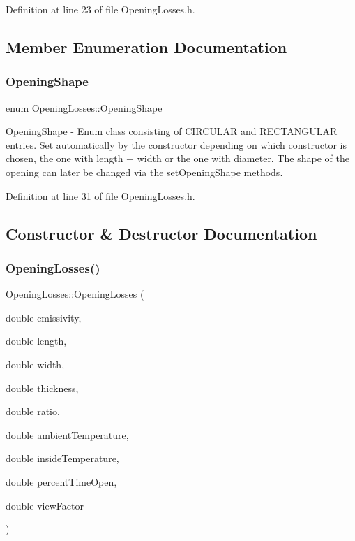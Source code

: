 Definition at line 23 of file Opening\+Losses.\+h.



\subsection{Member Enumeration Documentation}
\mbox{\label{class_opening_losses_a57f9759b6fd72a1b75aa885800e26157}} 
\subsubsection{\texorpdfstring{Opening\+Shape}{OpeningShape}}
{\footnotesize\ttfamily enum \hyperlink{class_opening_losses_a57f9759b6fd72a1b75aa885800e26157}{Opening\+Losses\+::\+Opening\+Shape}\hspace{0.3cm}{\ttfamily [strong]}}

Opening\+Shape -\/ Enum class consisting of C\+I\+R\+C\+U\+L\+AR and R\+E\+C\+T\+A\+N\+G\+U\+L\+AR entries. Set automatically by the constructor depending on which constructor is chosen, the one with length + width or the one with diameter. The shape of the opening can later be changed via the set\+Opening\+Shape methods. 

Definition at line 31 of file Opening\+Losses.\+h.



\subsection{Constructor \& Destructor Documentation}
\mbox{\label{class_opening_losses_a74205733c9a9b328bd9bf15c73841a8f}} 
\subsubsection{\texorpdfstring{Opening\+Losses()}{OpeningLosses()}\hspace{0.1cm}{\footnotesize\ttfamily [1/2]}}
{\footnotesize\ttfamily Opening\+Losses\+::\+Opening\+Losses (\begin{DoxyParamCaption}\item[{double}]{emissivity,  }\item[{double}]{length,  }\item[{double}]{width,  }\item[{double}]{thickness,  }\item[{double}]{ratio,  }\item[{double}]{ambient\+Temperature,  }\item[{double}]{inside\+Temperature,  }\item[{double}]{percent\+Time\+Open,  }\item[{double}]{view\+Factor }\end{DoxyParamCaption})\hspace{0.3cm}{\ttfamily [inline]}}

